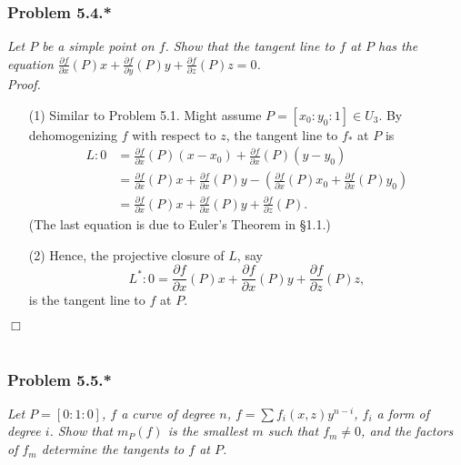 \documentclass{article}
\begin{document}
\subsubsection*{Problem 5.4.*}
\emph{Let $P$ be a simple point on $f$.
Show that the tangent line to $f$ at $P$ has the equation
$\frac{\partial f}{\partial x}(P) x +
\frac{\partial f}{\partial y}(P) y +
\frac{\partial f}{\partial z}(P) z = 0$.} \\



\emph{Proof.}
\begin{enumerate}
\item[(1)]
  Similar to Problem 5.1.
  Might assume $P = [x_0:y_0:1] \in U_3$.
  By dehomogenizing $f$ with respect to $z$,
  the tangent line to $f_{*}$ at $P$ is
  \begin{align*}
    L: 0
    &=
    \frac{\partial f}{\partial x}(P) (x-x_0) + \frac{\partial f}{\partial x}(P) (y-y_0) \\
    &=
    \frac{\partial f}{\partial x}(P) x + \frac{\partial f}{\partial x}(P) y
      - \left( \frac{\partial f}{\partial x}(P) x_0 + \frac{\partial f}{\partial x}(P) y_0 \right) \\
    &=
    \frac{\partial f}{\partial x}(P) x + \frac{\partial f}{\partial x}(P) y
      + \frac{\partial f}{\partial z}(P).
  \end{align*}
  (The last equation is due to Euler's Theorem in \S 1.1.)

\item[(2)]
  Hence,
  the projective closure of $L$, say
  \[
    L^{*}: 0 =
    \frac{\partial f}{\partial x}(P) x
      + \frac{\partial f}{\partial x}(P) y
      + \frac{\partial f}{\partial z}(P) z,
  \]
  is the tangent line to $f$ at $P$.
\end{enumerate}
$\Box$ \\\\






\subsubsection*{Problem 5.5.*}
\emph{Let $P = [0:1:0]$, $f$ a curve of degree $n$,
$f = \sum f_i(x,z)y^{n-i}$, $f_i$ a form of degree $i$.
Show that $m_P(f)$ is the smallest $m$ such that $f_m \neq 0$,
and the factors of $f_m$ determine the tangents to $f$ at $P$.} \\
\end{document}
